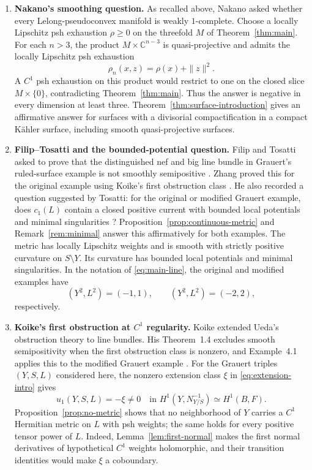 \documentclass[11pt]{amsart}
\theoremstyle{definition}
\theoremstyle{remark}
\numberwithin{equation}{section}
\newcommand{\C}{\mathbb C}
\begin{document}
\begin{enumerate}[label=\textbf{(\roman*)},widest=iii,leftmargin=*]
\item \textbf{Nakano's smoothing question.}
As recalled above, Nakano asked whether every Lelong-pseudoconvex
manifold is weakly $1$-complete.
Choose a locally Lipschitz psh exhaustion $\rho\ge0$ on the threefold
$M$ of Theorem~\ref{thm:main}.
For each $n>3$, the product $M\times\C^{n-3}$ is quasi-projective and
admits the locally Lipschitz psh exhaustion
\[
 \rho_n(x,z)=\rho(x)+\|z\|^2.
\]
A $C^1$ psh exhaustion on this product would restrict to one on the
closed slice $M\times\{0\}$, contradicting Theorem~\ref{thm:main}.
Thus the answer is negative in every dimension at least three.
Theorem~\ref{thm:surface-introduction} gives an affirmative answer for
surfaces with a divisorial compactification in a compact K\"ahler
surface, including smooth quasi-projective surfaces.

\item \textbf{Filip--Tosatti and the bounded-potential question.}
Filip and Tosatti asked to prove that the distinguished nef and big
line bundle in Grauert's ruled-surface example is not smoothly
semipositive \cite[Problem~2.2, p.~2989]{FilipTosatti2018}.
Zhang proved this for the original example using Koike's first
obstruction class \cite[Theorem~1.2]{Zhang2025}.
He also recorded a question suggested by Tosatti: for the original
or modified Grauert example, does $c_1(L)$ contain a closed positive
current with bounded local potentials and minimal singularities
\cite[\S4]{Zhang2025}?
Proposition~\ref{prop:continuous-metric} and Remark~\ref{rem:minimal}
answer this affirmatively for both examples. The metric has locally
Lipschitz weights and is smooth with strictly positive curvature on
$S\setminus Y$. Its curvature has bounded local potentials and minimal
singularities. In the notation of \eqref{eq:main-line}, the original
and modified examples have
\[
 (Y^2,L^2)=(-1,1),\qquad (Y^2,L^2)=(-2,2),
\]
respectively.

\item \textbf{Koike's first obstruction at \boldmath$C^1$ regularity.}
Koike extended Ueda's obstruction theory to line bundles. His
Theorem~1.4 excludes smooth semipositivity when the first obstruction
class is nonzero, and Example~4.1 applies this to the modified Grauert
example \cite{Koike2021}.
For the Grauert triples $(Y,S,L)$ considered here, the nonzero extension class
$\xi$ in \eqref{eq:extension-intro} gives
\[
 u_1(Y,S,L)=-\xi\ne0
 \quad\text{in }H^1(Y,N_{Y/S}^{-1})\simeq H^1(B,F).
\]
Proposition~\ref{prop:no-metric} shows that no neighborhood of $Y$
carries a $C^1$ Hermitian metric on $L$ with psh weights; the same
holds for every positive tensor power of $L$.
Indeed, Lemma~\ref{lem:first-normal} makes the first normal derivatives
of hypothetical $C^1$ weights holomorphic, and their transition
identities would make $\xi$ a coboundary.


\end{enumerate}
\end{document}
